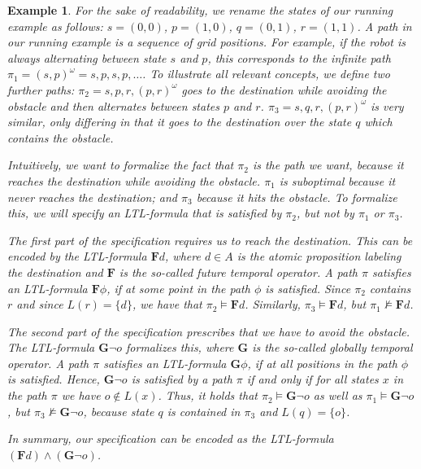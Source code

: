 \documentclass[11pt]{article}
\newtheorem{example}{Example}
\begin{document}
\begin{example}
	For the sake of readability, we rename the states of our running example as follows:
	$s=(0,0)$, $p=(1,0)$, $q=(0,1)$, $r=(1,1)$.
	A path in our running example is a sequence of grid positions.
	For example, if the robot is always alternating between state $s$ and $p$, this corresponds to the infinite path $\pi_1 = (s,p)^\omega = s,p,s,p,\ldots$.
	To illustrate all relevant concepts, we define two further paths:
	$\pi_2 = s,p,r,(p,r)^\omega$ goes to the destination while avoiding the obstacle and then alternates between states $p$ and $r$.
	$\pi_3 = s,q,r,(p,r)^\omega$ is very similar, only differing in that it goes to the destination over the state $q$ which contains the obstacle.
	
	Intuitively, we want to formalize the fact that $\pi_2$ is the path we want, because it reaches the destination while avoiding the obstacle. 
	$\pi_1$ is suboptimal because it never reaches the destination; and $\pi_3$ because it hits the obstacle.
	To formalize this, we will specify an LTL-formula that is satisfied by $\pi_2$, but not by $\pi_1$ or $\pi_3$.
	
	The first part of the specification requires us to reach the destination. This can be encoded by the LTL-formula $\mathbf F d$, where $d \in A$ is the atomic proposition labeling the destination and $\mathbf F$ is the so-called \emph{future} temporal operator.
	A path $\pi$ satisfies an LTL-formula $\mathbf F \phi$, if at some point in the path $\phi$ is satisfied.
	Since $\pi_2$ contains $r$ and since $L(r)=\{d\}$, we have that $\pi_2 \models \mathbf F d$. Similarly, $\pi_3\models \mathbf F d$, but $\pi_1\not\models\mathbf F d$.
	
	The second part of the specification prescribes that we have to avoid the obstacle. The LTL-formula $\mathbf G \neg o$ formalizes this, where $\mathbf G$ is the so-called \emph{globally} temporal operator.
	A path $\pi$ satisfies an LTL-formula $\mathbf G \phi$, if at all positions in the path $\phi$ is satisfied.
	Hence, $\mathbf G \neg o$ is satisfied by a path $\pi$ if and only if for all states $x$ in the path $\pi$ we have $o \notin L(x)$.
	Thus, it holds that $\pi_2 \models \mathbf G \neg o$ as well as $\pi_1 \models \mathbf G \neg o$, but $\pi_3 \not\models \mathbf G \neg o$, because state $q$ is contained in $\pi_3$ and $L(q)=\{o\}$.
		
	In summary, our specification can be encoded as the LTL-formula $(\mathbf F d) \wedge (\mathbf G \neg o)$.	
\end{example}
\end{document}
